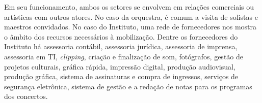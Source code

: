 \documentclass[a4paper, 12pt, openright, oneside, german, french, english, brazil]{abntex2}
\begin{document}








	Em seu funcionamento, ambos os setores se envolvem em relações comerciais ou artísticas com outros atores. No caso da orquestra, é comum a visita de solistas e maestros convidados. No caso do Instituto, uma rede de fornecedores nos mostra o âmbito dos recursos necessários à mobilização. Dentre os fornecedores do Instituto há assessoria contábil, assessoria jurídica, assessoria de imprensa, assessoria em TI, \textit{clipping}, criação e finalização de som, fotógrafos, gestão de projetos culturais, gráfica rápida, impressão digital, produção audiovisual, produção gráfica, sistema de assinaturas e compra de ingressos, serviços de segurança eletrônica, sistema de gestão e a redação de notas para os programas dos concertos.









\end{document}
